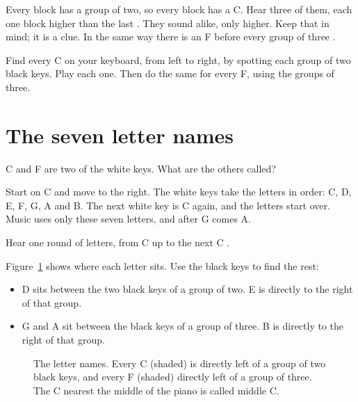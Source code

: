 Every block has a group of two, so every block has a C. Hear three of them, each one block higher than the last . They sound alike, only higher. Keep that in mind; it is a clue. In the same way there is an F before every group of three .

\begin{tryitbox}
Find every C on your keyboard, from left to right, by spotting each group of two black keys. Play each one. Then do the same for every F, using the groups of three.
\end{tryitbox}

\section{The seven letter names}

C and F are two of the white keys. What are the others called?

Start on C and move to the right. The white keys take the letters in order: C, D, E, F, G, A and B. The next white key is C again, and the letters start over. Music uses only these seven letters, and after G comes A.

Hear one round of letters, from C up to the next C .

Figure~\ref{fig:keyboard-names} shows where each letter sits. Use the black keys to find the rest:
\begin{itemize}
  \item D sits between the two black keys of a group of two. E is directly to the right of that group.
  \item G and A sit between the black keys of a group of three. B is directly to the right of that group.
\end{itemize}

\begin{figure}[htbp]
\centering
{}
\caption{The letter names. Every C (shaded) is directly left of a group of two black keys, and every F (shaded) directly left of a group of three. The C nearest the middle of the piano is called middle C.}
\label{fig:keyboard-names}
\end{figure}

